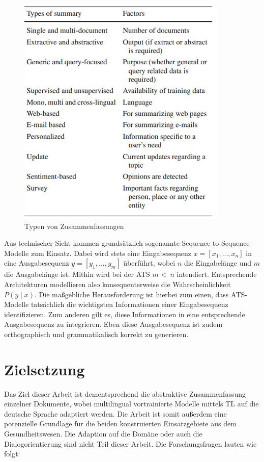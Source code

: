 \begin{figure}
  \centering
  \includegraphics[scale=0.8]{./source/images/systemtypen.jpg}
  \caption{Typen von Zusammenfassungen \cite{GAM16}}
  \label{pic:Systemtypen}
\end{figure}

Aus technischer Sicht kommen grundsätzlich sogenannte Sequence-to-Sequence-Modelle zum Einsatz. Dabei wird stets eine Eingabesequenz $x = [x_{1}, ..., x_{n}]$ in eine Ausgabesequenz $y = [y_{1}, ..., y_{m}]$ überführt, wobei $n$ die Eingabelänge und $m$ die Ausgabelänge ist. Mithin wird bei der \ac{ATS} $m$ \textless \, $n$ intendiert. Entsprechende Architekturen modellieren also konsequenterweise die Wahrscheinlichkeit $P(y \mid x)$. Die maßgebliche Herausforderung ist hierbei zum einen, dass \ac{ATS}-Modelle tatsächlich die wichtigsten Informationen einer Eingabesequenz identifizieren. Zum anderen gilt es, diese Informationen in eine entsprechende Ausgabesequenz zu integrieren. Eben diese Ausgabesequenz ist zudem orthographisch und grammatikalisch korrekt zu generieren.\\



\section{Zielsetzung}
Das Ziel dieser Arbeit ist dementsprechend die abstraktive Zusammenfassung einzelner Dokumente, wobei multilingual vortrainierte Modelle mittels \ac{TL} auf die deutsche Sprache adaptiert werden. Die Arbeit ist somit außerdem eine potenzielle Grundlage für die beiden konstruierten Einsatzgebiete aus dem Gesundheitswesen. Die Adaption auf die Domäne oder auch die Dialogorientierung sind nicht Teil dieser Arbeit. Die Forschungsfragen lauten wie folgt:

